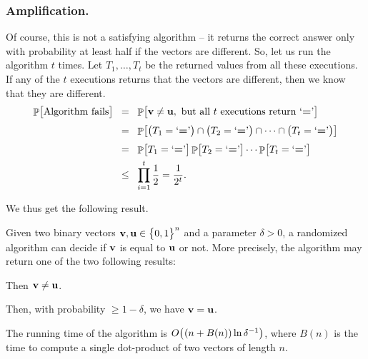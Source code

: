 \newcommand{\RetEq}{\ensuremath{\text{`$\boldsymbol =$'}}\xspace}
\newcommand{\RetNEq}{\ensuremath{\text{`$\boldsymbol \ne$'}}\xspace}

\subsubsection{Amplification.}

Of course, this is not a satisfying algorithm -- it returns the
correct answer only with probability at least half if the vectors are
different. So, let us run the algorithm $t$ times.  Let $T_1, \ldots,
T_t$ be the returned values from all these executions.  If any of the
$t$ executions returns that the vectors are different, then we know
that they are different.
\begin{align*}
  \Prob{ \bigl. \text{Algorithm fails}}%
  &\EQ%
    \Prob{ \bigl. \vecA \neq \vecB, \text{ but all $t$ executions
    return `$\boldsymbol =$'}}%
  \\
  &\EQ%
    \Bigl.\Prob{ \bigl.%
    \pth[]{\bigl. T_1 = \RetEq}%
    \cap%
    \pth[]{\bigl. T_2 = \RetEq}%
    \cap%
    \cdots%
    \cap%
    \pth[]{\bigl. T_t = \RetEq}%
    }%
  \\%
  &\EQ%
    \Prob{ \bigl.%
    {\bigl. T_1 = \RetEq}%
    }%
    \Prob{ {\bigl. T_2 = \RetEq} }%
    \cdots%
    \Prob{ {\bigl. T_t = \RetEq} }%
    \\&
    \LEQ%
    \prod_{i=1}^t \frac{1}{2} = \frac{1}{2^t}.
\end{align*}

We thus get the following result.

\begin{lemma}
    Given two binary vectors $\mathbf{v}, \mathbf{u} \in \left\{ {\bigl. 0,1} \right\}^n$ and
    a  parameter $\delta > 0$, a randomized
    algorithm can decide if $\mathbf{v}$ is equal to $\mathbf{u}$ or not. More
    precisely, the algorithm may return one of the two following
    results:
    \begin{compactenumA}
        \item[\qquad$\boldsymbol \ne$:] Then $\mathbf{v} \neq \mathbf{u}$.

        \item[\qquad $\boldsymbol =$:] Then, with probability
        $\geq 1-\delta$, we have $\mathbf{v} = \mathbf{u}$.
    \end{compactenumA}
    The running time of the algorithm is
    $ O\pth{ \bigl. \ts (n + B(n)) \ln \delta^{-1} }$, where $B(n)$ is
    the time to compute a single dot-product of two vectors of length
    $n$.
\end{lemma}

